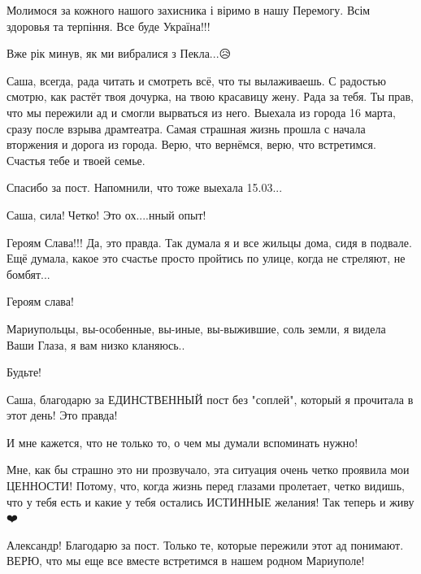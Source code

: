 Молимося за кожного нашого захисника і віримо в нашу Перемогу. Всім здоровья та
терпіння. Все буде Україна!!!


Вже рік минув, як ми вибралися з Пекла...😥


Саша, всегда, рада читать и смотреть всё, что ты вылаживаешь. С радостью
смотрю, как растёт твоя дочурка, на твою красавицу жену. Рада за тебя. Ты прав,
что мы пережили ад и смогли вырваться из него. Выехала из города 16 марта,
сразу после взрыва драмтеатра. Самая страшная жизнь прошла с начала вторжения и
дорога из города. Верю, что вернёмся, верю, что встретимся. Счастья тебе и
твоей семье.


Спасибо за пост. Напомнили, что тоже выехала 15.03...


Саша, сила!💪Четко! Это ох....нный опыт!


Героям Слава!!! Да, это правда. Так думала я и все жильцы дома, сидя в подвале.
Ещё думала, какое это счастье просто пройтись по улице, когда не стреляют, не
бомбят...


Героям слава!


Мариупольцы, вы-особенные, вы-иные, вы-выжившие, соль земли, я видела Ваши Глаза, я вам низко кланяюсь..

Будьте!


Саша, благодарю за ЕДИНСТВЕННЫЙ пост без "соплей", который я прочитала в этот
день! Это правда!

И мне кажется, что не только то, о чем мы думали вспоминать нужно!

Мне, как бы страшно это ни прозвучало, эта ситуация очень четко проявила мои
ЦЕННОСТИ! Потому, что, когда жизнь перед глазами пролетает, четко видишь, что у
тебя есть и какие у тебя остались ИСТИННЫЕ желания! Так теперь и живу ❤️


Александр! Благодарю за пост. Только те, которые пережили этот ад понимают.
ВЕРЮ, что мы еще все вместе встретимся в нашем родном Мариуполе!



